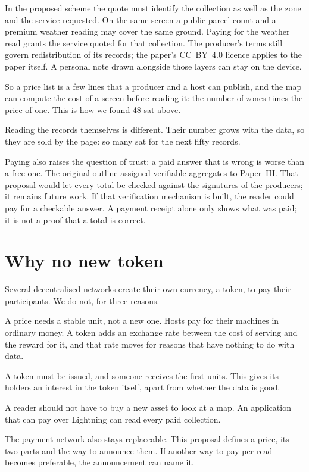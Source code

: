\documentclass[11pt]{article}
\begin{document}
In the proposed scheme the quote must identify the collection as well as the zone and the service requested. On the same screen a public parcel count and a premium weather reading may cover the same ground. Paying for the weather read grants the service quoted for that collection. The producer's terms still govern redistribution of its records; the paper's CC~BY~4.0 licence applies to the paper itself. A personal note drawn alongside those layers can stay on the device.

So a price list is a few lines that a producer and a host can publish, and the map can compute the cost of a screen before reading it: the number of zones times the price of one. This is how we found 48 sat above.

Reading the records themselves is different. Their number grows with the data, so they are sold by the page: so many sat for the next fifty records.

Paying also raises the question of trust: a paid answer that is wrong is worse than a free one. The original outline assigned verifiable aggregates to Paper~III. That proposal would let every total be checked against the signatures of the producers; it remains future work. If that verification mechanism is built, the reader could pay for a checkable answer. A payment receipt alone only shows what was paid; it is not a proof that a total is correct.

\section{Why no new token}

Several decentralised networks create their own currency, a token, to pay their participants. We do not, for three reasons.

A price needs a stable unit, not a new one. Hosts pay for their machines in ordinary money. A token adds an exchange rate between the cost of serving and the reward for it, and that rate moves for reasons that have nothing to do with data.

A token must be issued, and someone receives the first units. This gives its holders an interest in the token itself, apart from whether the data is good.

A reader should not have to buy a new asset to look at a map. An application that can pay over Lightning can read every paid collection.

The payment network also stays replaceable. This proposal defines a price, its two parts and the way to announce them. If another way to pay per read becomes preferable, the announcement can name it.
\end{document}

